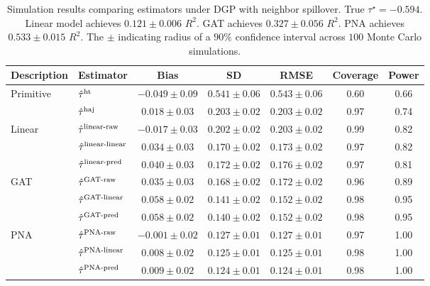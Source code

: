 \documentclass{article}
\theoremstyle{plain}
\theoremstyle{definition}
\theoremstyle{remark}
\newcommand{\hort}{\textup{ht}}
\newcommand{\haj}{\textup{haj}}
\begin{document}
\begin{table}[h!]
    \centering
    \caption{Simulation results comparing estimators under DGP with neighbor spillover. True $\tau^\star = -0.594$. Linear model achieves $0.121 \pm 0.006$ $R^2$. GAT achieves $0.327 \pm 0.056$ $R^2$. PNA achieves $0.533 \pm 0.015 $ $R^2$. The $\pm$ indicating radius of a $90\%$ confidence interval across $100$ Monte Carlo simulations. }
    \small
    \begin{tabular}{ll|ccc|cc}
        \toprule
        Description & Estimator & Bias & SD & RMSE & Coverage & Power \\
        \midrule
        Primitive  & $\hat\tau^{\hort}$ & $-0.049 \pm 0.09$ & $0.541 \pm 0.06$ & $0.543 \pm 0.06$ & 0.60 & 0.66 \\
        & $\hat\tau^{\haj}$ & $0.018 \pm 0.03$ & $0.203 \pm 0.02$ & $0.203 \pm 0.02$ & 0.97 & 0.74 \\
        \midrule
        Linear 
        & $\hat\tau^{\textup{linear-raw}}$ & $-0.017 \pm 0.03$ & $0.202 \pm 0.02$ & $0.203 \pm 0.02$ & 0.99 & 0.82 \\
        & $\hat\tau^{\textup{linear-linear}}$ & $0.034 \pm 0.03$ & $0.170 \pm 0.02$ & $0.173 \pm 0.02$ & 0.97 & 0.82 \\
        & $\hat\tau^{\textup{linear-pred}}$ & $0.040 \pm 0.03$ & $0.172 \pm 0.02$ & $0.176 \pm 0.02$ & 0.97 & 0.81 \\
        \midrule
        GAT 
        & $\hat\tau^{\textup{GAT-raw}}$ & $0.035 \pm 0.03$ & $0.168 \pm 0.02$ & $0.172 \pm 0.02$ & 0.96 & 0.89 \\
        & $\hat\tau^{\textup{GAT-linear}}$ & $0.058 \pm 0.02$ & $0.141 \pm 0.02$ & $0.152 \pm 0.02$ & 0.98 & 0.95 \\
        & $\hat\tau^{\textup{GAT-pred}}$ & $0.058 \pm 0.02$ & $0.140 \pm 0.02$ & $0.152 \pm 0.02$ & 0.98 & 0.95 \\
        \midrule
        PNA 
        & $\hat\tau^{\textup{PNA-raw}}$ & $\mathbf{-0.001 \pm 0.02}$ & $\mathbf{0.127 \pm 0.01}$ & $\mathbf{0.127 \pm 0.01}$ & 0.97 & 1.00 \\
        & $\hat\tau^{\textup{PNA-linear}}$ & $\mathbf{0.008 \pm 0.02}$ & $\mathbf{0.125 \pm 0.01}$ & $\mathbf{0.125 \pm 0.01}$ & 0.98 & 1.00 \\
        & $\hat\tau^{\textup{PNA-pred}}$ & $\mathbf{0.009 \pm 0.02}$ & $\mathbf{0.124 \pm 0.01}$ & $\mathbf{0.124 \pm 0.01}$ & 0.98 & 1.00 \\
        \bottomrule
    \end{tabular}
    \label{tab::simu_results}
\end{table}
\end{document}
